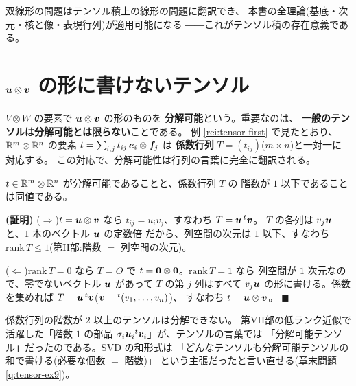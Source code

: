 双線形の問題はテンソル積上の線形の問題に翻訳でき、
本書の全理論(基底・次元・核と像・表現行列)が適用可能になる
――これがテンソル積の存在意義である。

\section{$\bm{u} \otimes \bm{v}$ の形に書けないテンソル}

$V \otimes W$ の要素で $\bm{u} \otimes \bm{v}$ の形のものを
\textbf{分解可能}という。重要なのは、
\textbf{一般のテンソルは分解可能とは限らない}ことである。
例 \ref{rei:tensor-first} で見たとおり、$\mathbb{R}^m \otimes \mathbb{R}^n$ の要素
$t = \sum_{i,j} t_{ij}\,\bm{e}_i \otimes \bm{f}_j$ は
\textbf{係数行列} $T = (t_{ij})$($m \times n$)と一対一に対応する。
この対応で、分解可能性は行列の言葉に完全に翻訳される。

\begin{teiri}\label{thm:tensor-rank1}
$t \in \mathbb{R}^m \otimes \mathbb{R}^n$ が分解可能であることと、係数行列 $T$ の
階数が $1$ 以下であることは同値である。
\end{teiri}

\noindent\textbf{(証明)}\quad
($\Rightarrow$)$t = \bm{u} \otimes \bm{v}$ なら
$t_{ij} = u_i v_j$、すなわち $T = \bm{u}\,{}^t\bm{v}$。
$T$ の各列は $v_j \bm{u}$ と、$1$ 本のベクトル $\bm{u}$ の定数倍
だから、列空間の次元は $1$ 以下、すなわち
$\mathrm{rank}\,T \le 1$(第II部:階数 $=$ 列空間の次元)。

($\Leftarrow$)$\mathrm{rank}\,T = 0$ なら $T = O$ で
$t = \bm{0} \otimes \bm{0}$。$\mathrm{rank}\,T = 1$ なら
列空間が $1$ 次元なので、零でないベクトル $\bm{u}$ があって
$T$ の第 $j$ 列はすべて $v_j \bm{u}$ の形に書ける。係数を集めれば
$T = \bm{u}\,{}^t\bm{v}$($\bm{v} = {}^t(v_1, \dots, v_n)$)、
すなわち $t = \bm{u} \otimes \bm{v}$。 $\blacksquare$

係数行列の階数が $2$ 以上のテンソルは分解できない。
第VII部の低ランク近似で活躍した「階数 $1$ の部品
$\sigma_i \bm{u}_i{}^t\bm{v}_i$」が、テンソルの言葉では
「分解可能テンソル」だったのである。SVD の和形式は
「どんなテンソルも分解可能テンソルの和で書ける(必要な個数 $=$ 階数)」
という主張だったと言い直せる(章末問題 \ref{q:tensor-ex9})。

